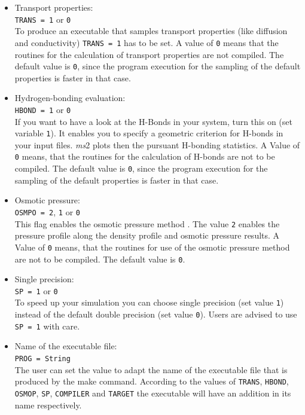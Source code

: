 \begin{itemize}
	\item Transport properties:\\
	\texttt{TRANS~=~1} or \texttt{0}\\
	To produce an executable that samples transport properties (like diffusion and conductivity)  \texttt{TRANS~=~1} has to be set. A value of \texttt{0} means that the routines for the calculation of transport properties are not compiled. The default value is \texttt{0}, since the program execution for the sampling of the default properties is faster in that case.
	\item Hydrogen-bonding evaluation:\\
	\texttt{HBOND~=~1} or \texttt{0}\\
	If you want to have a look at the H-Bonds in your system, turn this on (set variable \texttt{1}). %
	It enables you to specify a geometric criterion for H-bonds in your input files. \textit{ms}2 plots then the pursuant H-bonding statistics. A Value of \texttt{0} means, that the routines for the calculation of H-bonds are not to be compiled. The default value is \texttt{0}, since the program execution for the sampling of the default properties is faster in that case.
	\item Osmotic pressure:\\
	\texttt{OSMPO~=~2}, \texttt{1} or \texttt{0}\\
	This flag enables the osmotic pressure method%
	. The value \texttt{2} enables the pressure profile along the density profile and osmotic pressure results. %
	 A Value of \texttt{0} means, that the routines for use of the osmotic pressure method are not to be compiled. The default value is \texttt{0}.
	 \item Single precision:\\
	 \texttt{SP~=~1} or \texttt{0}\\
	 To speed up your simulation you can choose single precision (set value \texttt{1}) instead of the default double precision  (set value \texttt{0}). Users are advised to use \texttt{SP~=~1} with care.
	 \item Name of the executable file:\\
	 \texttt{PROG~=~String}\\
	 The user can set the value to adapt the name of the executable file that is produced by the make command. According to the values of \texttt{TRANS}, \texttt{HBOND}, \texttt{OSMOP}, \texttt{SP}, \texttt{COMPILER} and \texttt{TARGET} the executable will have an addition in its name respectively.
\end{itemize}

